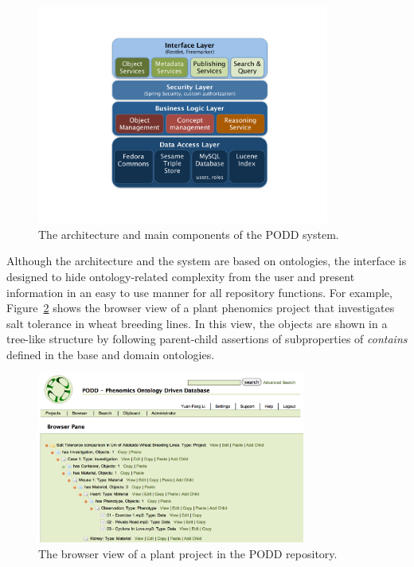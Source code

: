 \documentclass[conference,10pt]{IEEEtran}
\begin{document}
\vspace{-8pt}
\begin{figure}[htb]
\centering
\includegraphics[trim = 60mm 30mm 50mm 24mm, clip,height=72mm]{podd_arch.pdf}

\vspace{-8pt} \caption{The architecture and main components of the PODD system.}\label{fig:podd_arch}
\end{figure}

\vspace{-8pt}
Although the architecture and the system are based on ontologies, the interface is designed to hide ontology-related complexity from the user and present information in an easy to use manner for all repository functions. For example, Figure~\ref{fig:browser} shows the browser view of a plant phenomics project that investigates salt tolerance in wheat breeding lines. In this view, the objects are shown in a tree-like structure by following parent-child assertions of subproperties of \emph{contains} defined in  the base and domain ontologies.

\begin{figure}[!t]
\centering
\includegraphics[trim = 0mm 0mm 0mm 0mm, clip,width=88mm]{browser.png}
\vspace{-16pt} \caption{The browser view of a plant project in the PODD repository.}\label{fig:browser}
\end{figure}
\end{document}
